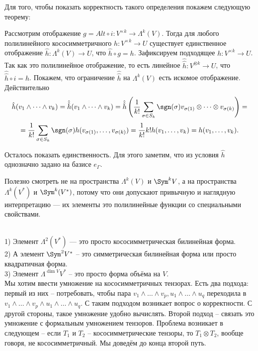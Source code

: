 Для того, чтобы показать корректность такого определения покажем следующую теорему:

\thrm Рассмотрим отображение $g=Alt \circ i \colon V^{\times k} \to \Lambda^k(V)$. Тогда для любого полилинейного кососимметричного $h \colon V^{\times k} \to U$ существует единственное отображение $\hat{h} \colon \Lambda^k(V) \to U$, что $\hat{h} \circ g = h$.
\proof Зафиксируем подходящее $h \colon V^{\times k} \to U$. Так как это полилинейное отображение, то есть линейное $\hat{\hat{h}}\colon V^{\otimes k} \to U$, что $\hat{\hat{h}} \circ i =h$. Покажем, что ограничение $\hat{\hat{h}}$ на $\Lambda^k(V)$ есть искомое отображение. Действительно $$\hat{h}(v_1\wedge\dots\wedge v_k)=\hat{\hat{h}}(v_1\wedge\dots\wedge v_k)=\hat{\hat{h}} \left(\frac{1}{k!} \sum_{\sigma \in S_k} \sgn(\sigma) v_{\sigma(1)}\otimes \dots \otimes v_{\sigma(k)} \right) =$$
$$=\frac{1}{k!} \sum_{\sigma \in S_k} \sgn(\sigma) h(v_{\sigma(1)},\dots,v_{\sigma(k)})=\frac{1}{k!}k!h(v_1,\dots,v_k)=h(v_1,\dots,v_k).$$

Осталось показать единственность. Для этого заметим, что из условия  $\hat{h}$ однозначно задано на базисе $e_{\Gamma}$.
\endproof
\ethrm


\fct Полезно смотреть не на пространства $\Lambda^k (V)$ и $\Sym^k V$, а на пространства $\Lambda^k(V^*)$ и $\Sym^k(V^*)$, потому что они допускают привычную и наглядную интерпретацию --- их элементы это полилинейные функции со специальными свойствами.
\efct


\exm \\
1) Элемент $\Lambda^2(V^*)$ --- это просто кососимметрическая билинейная форма.\\
2) А элемент $\Sym^2 V^*$ -- это симметрическая билинейная форма или просто квадратичная форма.\\
3) Элемент $\Lambda^{\dim V} V^*$ -- это просто форма объёма на $V$.\\

Мы хотим ввести умножение на кососимметричных тензорах. Есть два подхода: первый из них -- потребовать, чтобы пара $v_1 \wedge \dots \wedge v_p , u_1\wedge \dots \wedge u_q$ переходила в $v_1 \wedge \dots \wedge v_p \wedge u_1\wedge \dots \wedge u_q$. С таким подходом возникает вопрос о корректности. С другой стороны, такое умножение удобно вычислять. Второй подход -- связать это умножение с формальным умножением тензоров. Проблема возникает в следующем -- если $T_1$ и $T_2$ -- кососимметрические тензоры, то $T_1\otimes T_2$, вообще говоря, не кососимметричный. Мы доведём до конца второй путь.

